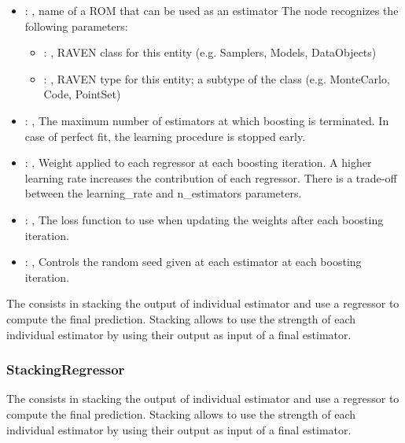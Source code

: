 \begin{itemize}
    \item {}: , 
      name of a ROM that can be used as an estimator
      The  node recognizes the following parameters:
        \begin{itemize}
          \item {}: , 
            RAVEN class for this entity (e.g. Samplers, Models, DataObjects)
          \item {}: , 
            RAVEN type for this entity; a subtype of the class (e.g. MonteCarlo, Code, PointSet)
      \end{itemize}

    \item {}: , 
      The maximum number of estimators at which boosting is
      terminated. In case of perfect fit, the learning procedure is
      stopped early.

    \item {}: , 
      Weight applied to each regressor at each boosting iteration.
      A higher learning rate increases the contribution of each regressor.
      There is a trade-off between the learning\_rate and n\_estimators
      parameters.

    \item {}: , 
      The loss function to use when updating the weights after each
      boosting iteration.

    \item {}: , 
      Controls the random seed given at each estimator at each
      boosting iteration.
  \end{itemize}
 The  consists in stacking the output of individual estimator and
 use a regressor to compute the final prediction. Stacking allows to use the strength of each
 individual estimator by using their output as input of a final estimator.

\subsubsection{StackingRegressor}
  The  consists in stacking the output of individual estimator and
  use a regressor to compute the final prediction. Stacking allows to use the strength of each
  individual estimator by using their output as input of a final estimator.

